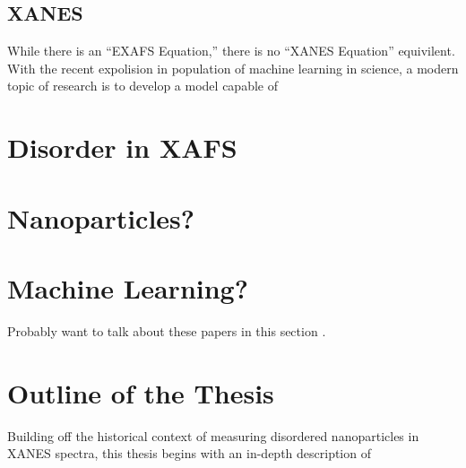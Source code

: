 \subsection{XANES}
While there is an ``EXAFS Equation,'' there is no ``XANES Equation'' equivilent. With the recent expolision in population of machine learning in science, a modern topic of research is to develop a model capable of 

\section{Disorder in XAFS}

\section{Nanoparticles?}
\section{Machine Learning?}

Probably want to talk about these papers in this section \cite{timoshenko2018neural} \cite{Timoshenko2017}.
\section{Outline of the Thesis}
Building off the historical context of measuring disordered nanoparticles in XANES spectra, this thesis begins with an in-depth description of 
